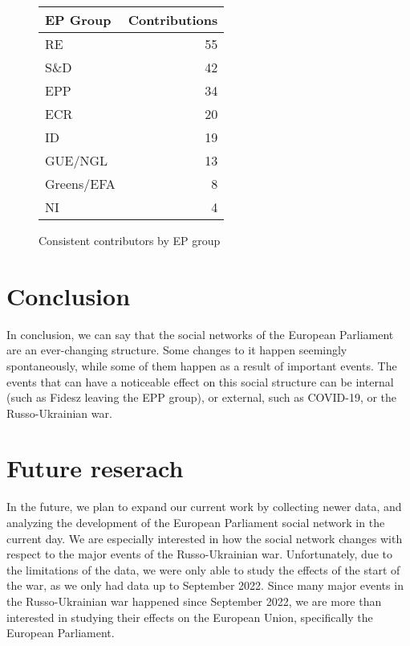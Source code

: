 \documentclass[lettersize,journal]{IEEEtran}
\begin{document}
\begin{figure}[h]
	\begin{center}
		\begin{tabular}{| l | r |}
			\hline
			EP Group & Contributions\\
			\hline
			RE & 55 \\
			S\&D & 42 \\
			EPP & 34 \\	
			ECR & 20 \\
			ID & 19 \\
			GUE/NGL & 13 \\
			Greens/EFA & 8 \\
			NI & 4 \\
			\hline
		\end{tabular}
		\caption{Consistent contributors by EP group}
		\label{epgroup_consistent_contributors}
	\end{center}
\end{figure}




\section{Conclusion} \label{sec:conclusion}

In conclusion, we can say that the social networks of the European Parliament are an ever-changing structure. Some changes to it happen seemingly spontaneously, while some of them happen as a result of important events. The events that can have a noticeable effect on this social structure can be internal (such as Fidesz leaving the EPP group), or external, such as COVID-19, or the Russo-Ukrainian war.

\section{Future reserach} \label{sec:futureresearch}

In the future, we plan to expand our current work by collecting newer data, and analyzing the development of the European Parliament social network in the current day. We are especially interested in how the social network changes with respect to the major events of the Russo-Ukrainian war. Unfortunately, due to the limitations of the data, we were only able to study the effects of the start of the war, as we only had data up to September 2022. Since many major events in the Russo-Ukrainian war happened since September 2022, we are more than interested in studying their effects on the European Union, specifically the European Parliament.
\end{document}
